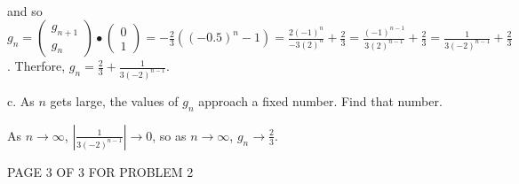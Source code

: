 \documentclass[12pt]{article}
\newenvironment{solution}[1][Solution]
{
	\begin{trivlist} 
		\item[\hskip \labelsep {\itshape #1:}]
	}
	{
	\end{trivlist}
}
\begin{document}
\begin{solution}
\begin{align*}
\end{align*}
and so $g_{n}=\begin{pmatrix}g_{n+1}\\g_{n}\end{pmatrix} \bullet \begin{pmatrix}0\\1\end{pmatrix} =  -\frac{2}{3}((-0.5)^{n}-1) = \frac{2(-1)^{n}}{-3(2)^{n}}+ \frac{2}{3} =\frac{(-1)^{n-1}}{3(2)^{n-1}} + \frac{2}{3} = \frac{1}{3(-2)^{n-1}} + \frac{2}{3}$. Therfore, $g_{n}=\frac{2}{3}+\frac{1}{3(-2)^{n-1}}$.
\end{solution}
\noindent
\newline
\newline
c. As $n$ gets large, the values of $g_{n}$ approach a fixed number. Find that number.
\begin{solution}
As $n \to \infty$, $|\frac{1}{3(-2)^{n-1}}| \to 0$, so as $n \to \infty$, $g_{n} \to \frac{2}{3}$.
\end{solution}
\vfill
\centerline{PAGE 3 OF 3 FOR PROBLEM 2}
\end{document}
